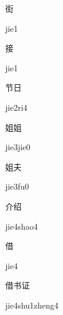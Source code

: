 \begin{multicols*}{2}
\begin{verbete}[jie1]{街}
\begin{pronuncia}{jie1}
\end{pronuncia}
\end{verbete}

\begin{verbete}[jie1]{接}
\begin{pronuncia}{jie1}
\end{pronuncia}
\end{verbete}

\begin{verbete}[jie2ri4]{节日}
\begin{pronuncia}{jie2ri4}
\end{pronuncia}
\end{verbete}

\begin{verbete}{姐姐}
\begin{pronuncia}{jie3jie0}
\end{pronuncia}
\end{verbete}

\begin{verbete}[jie3fu0]{姐夫}
\begin{pronuncia}{jie3fu0}
\end{pronuncia}
\end{verbete}

\begin{verbete}{介绍} 
\begin{pronuncia}{jie4shao4}
\end{pronuncia}
\end{verbete}

\begin{verbete}[jie4]{借} 
\begin{pronuncia}{jie4}
\end{pronuncia}
\end{verbete}

\begin{verbete}{借书证} 
\begin{pronuncia}{jie4shu1zheng4}
\end{pronuncia}
\end{verbete}


\end{multicols*}
